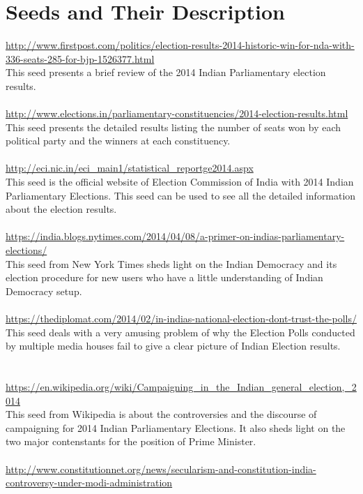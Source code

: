 \documentclass[11pt,journal,compsoc,onecolumn]{IEEEtran}
\begin{document}
\section{Seeds and Their Description}  
\url{http://www.firstpost.com/politics/election-results-2014-historic-win-for-nda-with-336-seats-285-for-bjp-1526377.html}\\\hypersetup{
  colorlinks, linkcolor=red
}
This seed presents a brief review of the 2014 Indian Parliamentary election results.\\
\\
\url{http://www.elections.in/parliamentary-constituencies/2014-election-results.html}\\
This seed presents the detailed results listing the number of seats won by each political party and the winners at each constituency.\\
\\
\url{http://eci.nic.in/eci_main1/statistical_reportge2014.aspx}\\
This seed is the official website of Election Commission of India with 2014 Indian Parliamentary Elections. This seed can be used to see all the detailed information about the election results.\\
\\
\url{https://india.blogs.nytimes.com/2014/04/08/a-primer-on-indias-parliamentary-elections/}\\
This seed from New York Times sheds light on the Indian Democracy and its election procedure for new users who have a little understanding of Indian Democracy setup.\\
\\
\url{https://thediplomat.com/2014/02/in-indias-national-election-dont-trust-the-polls/}\\
This seed deals with a very amusing problem of why the Election Polls conducted by multiple media houses fail to give a clear picture of Indian Election results.\\
\\
\\
\url{https://en.wikipedia.org/wiki/Campaigning_in_the_Indian_general_election,_2014}\\
This seed from Wikipedia is about the controversies and the discourse of campaigning for 2014 Indian Parliamentary Elections. It also sheds light on the two major contenstants for the position of Prime Minister. \\
\\
\url{http://www.constitutionnet.org/news/secularism-and-constitution-india-controversy-under-modi-administration}\\
\end{document}
